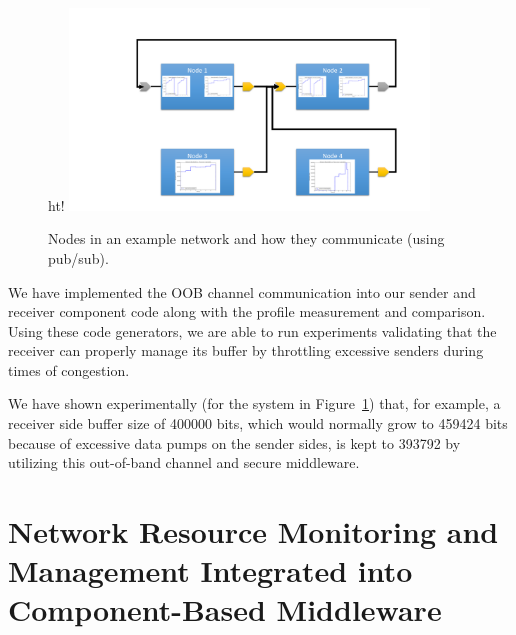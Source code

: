 \begin{figure}{ht!}
  \centering
  \includegraphics[width=0.85\textwidth]{../doc/src/images/results/example_setup.png}
  \caption{Nodes in an example network and how they communicate (using
    pub/sub).}
  \label{fig:ddos}
\end{figure}

We have implemented the OOB channel communication into our sender and
receiver component code along with the profile measurement and
comparison.  Using these code generators, we are able to run
experiments validating that the receiver can properly manage its
buffer by throttling excessive senders during times of congestion. 

We have shown experimentally (for the system in Figure~\ref{fig:ddos})
that, for example, a receiver side buffer size of 400000 bits, which
would normally grow to 459424 bits because of excessive data pumps on
the sender sides, is kept to 393792 by utilizing this out-of-band
channel and secure middleware.

\section{Network Resource Monitoring and Management Integrated into Component-Based Middleware}
\label{sec:drems}

